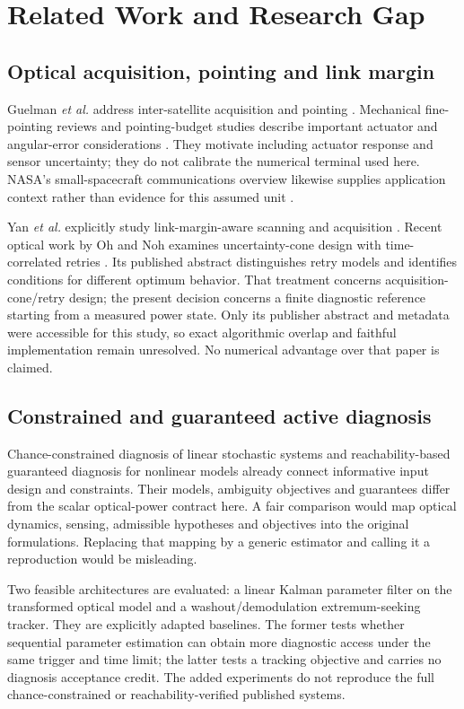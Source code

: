 \section{Related Work and Research Gap}
\subsection{Optical acquisition, pointing and link margin}
Guelman \emph{et al.} address inter-satellite acquisition and pointing \cite{guelman}. Mechanical fine-pointing reviews and pointing-budget studies describe important actuator and angular-error considerations \cite{actuators,baeck}. They motivate including actuator response and sensor uncertainty; they do not calibrate the numerical terminal used here. NASA's small-spacecraft communications overview likewise supplies application context rather than evidence for this assumed unit \cite{nasa}.

Yan \emph{et al.} explicitly study link-margin-aware scanning and acquisition \cite{yan}. Recent optical work by Oh and Noh examines uncertainty-cone design with time-correlated retries \cite{oh}. Its published abstract distinguishes retry models and identifies conditions for different optimum behavior. That treatment concerns acquisition-cone/retry design; the present decision concerns a finite diagnostic reference starting from a measured power state. Only its publisher abstract and metadata were accessible for this study, so exact algorithmic overlap and faithful implementation remain unresolved. No numerical advantage over that paper is claimed.

\subsection{Constrained and guaranteed active diagnosis}
Chance-constrained diagnosis of linear stochastic systems \cite{guo} and reachability-based guaranteed diagnosis for nonlinear models \cite{massa} already connect informative input design and constraints. Their models, ambiguity objectives and guarantees differ from the scalar optical-power contract here. A fair comparison would map optical dynamics, sensing, admissible hypotheses and objectives into the original formulations. Replacing that mapping by a generic estimator and calling it a reproduction would be misleading.

Two feasible architectures are evaluated: a linear Kalman parameter filter on the transformed optical model and a washout/demodulation extremum-seeking tracker. They are explicitly adapted baselines. The former tests whether sequential parameter estimation can obtain more diagnostic access under the same trigger and time limit; the latter tests a tracking objective and carries no diagnosis acceptance credit. The added experiments do not reproduce the full chance-constrained or reachability-verified published systems.

